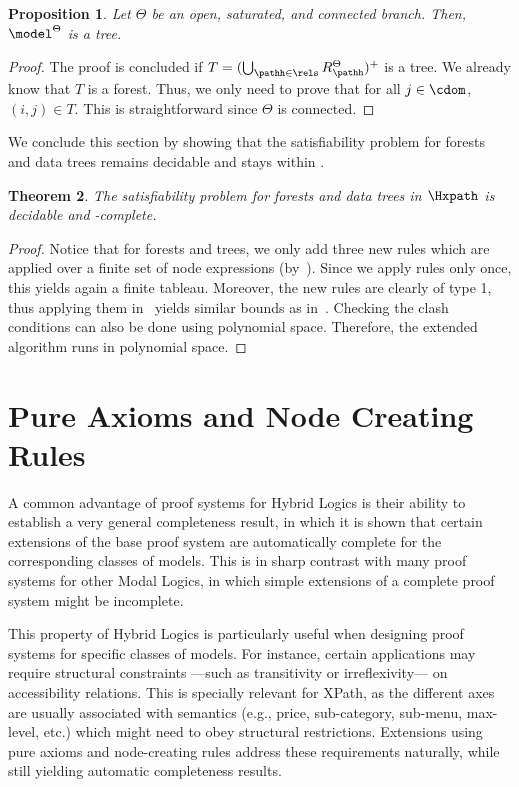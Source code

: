 \documentclass[10pt,a4paper]{amsart}
\newtheorem{thm}{Theorem}[section]
\newtheorem{prop}[thm]{Proposition}
\theoremstyle{definition}
\theoremstyle{remark}
\begin{document}
\begin{prop}
    \label{prop:connectedtree}
    Let $\Theta$ be an open, saturated, and connected branch. Then, $\model^{\Theta}$ is a tree. 
\end{prop}

\begin{proof}
    The proof is concluded if $T = (\bigcup_{\pathh\in\rels} R_{\pathh}^{\Theta})^{+}$ is a tree.
    We already know that $T$ is a forest.
    Thus, we only need to prove that for all $j\in\cdom$, $(i,j)\in \mathbin{T}$.
    This is straightforward since $\Theta$ is connected.
\end{proof}

We conclude this section by showing that the satisfiability problem for forests and data trees remains decidable and stays within \pspace.

\begin{thm}
    \label{th:terminationtrees}
   The satisfiability problem for forests and data trees in $\Hxpath$ is decidable and \pspace-complete.
\end{thm}

\begin{proof}
    Notice that for forests and trees, we only add three new rules which are applied over
    a finite set of node expressions (by~). Since we apply rules only once, this yields again a finite tableau. Moreover, the new rules are clearly of type 1, thus applying them in~ yields similar bounds as in~. Checking the clash conditions can also be done using polynomial space. Therefore, the extended algorithm runs in polynomial space.
\end{proof}


\section{Pure Axioms and Node Creating Rules}
\label{sec:pure-ext}

A common advantage of proof systems for Hybrid Logics is their ability to establish a very general completeness result, in which it is shown that certain extensions of the base proof system are automatically complete for the corresponding classes of models.  This is in sharp contrast with many proof systems for other Modal Logics, in which simple extensions of a complete proof system might be incomplete.

This property of Hybrid Logics is particularly useful when designing proof systems for specific classes of models. For instance, certain applications may require structural constraints ---such as transitivity or irreflexivity--- on accessibility relations.
This is specially relevant for XPath, as the different axes are usually associated with semantics (e.g., price, sub-category, sub-menu, max-level, etc.) which might need to obey structural restrictions. 
Extensions using pure axioms and node-creating rules address these requirements naturally, while still yielding automatic completeness results.
\end{document}
